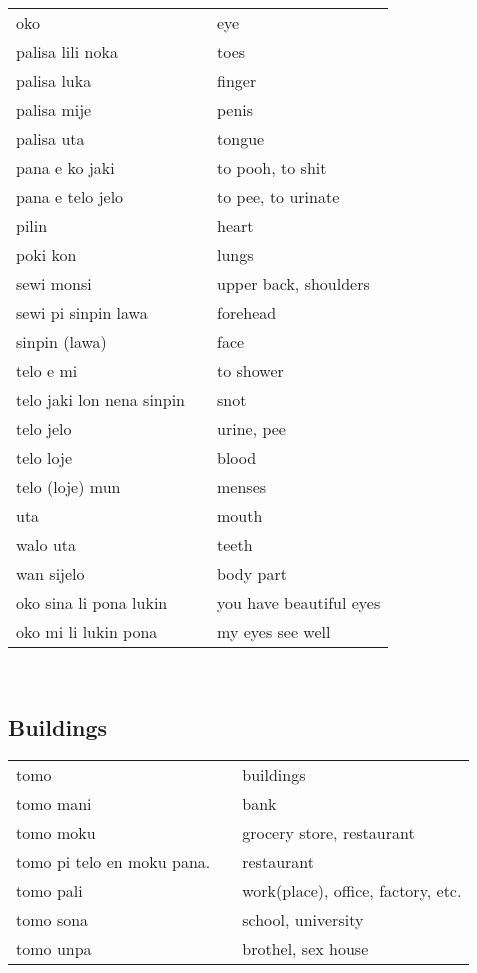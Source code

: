 \begin{supertabular}{p{4,5cm}|ll}
oko && eye \\
palisa lili noka && toes \\
palisa luka && finger \\
palisa mije && penis \\
palisa uta && tongue \\
pana e ko jaki && to pooh, to shit \\
pana e telo jelo && to pee, to urinate \\
pilin && heart \\
poki kon && lungs \\
sewi monsi && upper back, shoulders \\
sewi pi sinpin lawa && forehead \\
sinpin (lawa) && face \\
telo e mi && to shower \\
telo jaki lon nena sinpin && snot \\
telo jelo && urine, pee \\
telo loje && blood \\
telo (loje) mun && menses \\
uta && mouth \\
walo uta && teeth \\
wan sijelo && body part \\
oko sina li pona lukin && you have beautiful eyes \\
oko mi li lukin pona && my eyes see well \\
\end{supertabular} \\
%
%
\subsection{Buildings}
%
\begin{supertabular}{p{4,5cm}|ll}
tomo && buildings \\
tomo mani && bank \\
tomo moku && grocery store, restaurant \\
tomo pi telo en moku pana. && restaurant \\
tomo pali && work(place), office, factory, etc. \\
tomo sona && school, university \\
tomo unpa && brothel, sex house \\
\end{supertabular} \\
%
%
